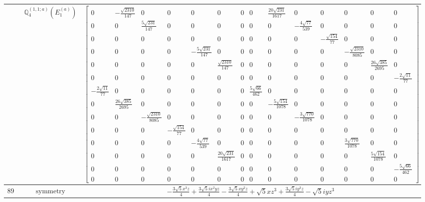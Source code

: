 \documentclass[fleqn,8pt,landscape]{jsarticle}
\begin{document}
\begin{longtable}{ccc}
$  $ & $ \mathbb{Q}_{4}^{(1,1;a)}(E_{1}^{(a)}) $ & $ \begin{bmatrix} 0 & - \frac{\sqrt{2310}}{147} & 0 & 0 & 0 & 0 & 0 & 0 & \frac{20 \sqrt{231}}{1617} & 0 & 0 & 0 & 0 & 0 \\ 0 & 0 & \frac{5 \sqrt{231}}{147} & 0 & 0 & 0 & 0 & 0 & 0 & - \frac{4 \sqrt{77}}{539} & 0 & 0 & 0 & 0 \\ 0 & 0 & 0 & 0 & 0 & 0 & 0 & 0 & 0 & 0 & - \frac{\sqrt{154}}{77} & 0 & 0 & 0 \\ 0 & 0 & 0 & 0 & - \frac{5 \sqrt{231}}{147} & 0 & 0 & 0 & 0 & 0 & 0 & - \frac{\sqrt{2310}}{8085} & 0 & 0 \\ 0 & 0 & 0 & 0 & 0 & \frac{\sqrt{2310}}{147} & 0 & 0 & 0 & 0 & 0 & 0 & \frac{26 \sqrt{385}}{2695} & 0 \\ 0 & 0 & 0 & 0 & 0 & 0 & 0 & 0 & 0 & 0 & 0 & 0 & 0 & - \frac{2 \sqrt{11}}{77} \\ - \frac{2 \sqrt{11}}{77} & 0 & 0 & 0 & 0 & 0 & 0 & \frac{5 \sqrt{66}}{462} & 0 & 0 & 0 & 0 & 0 & 0 \\ 0 & \frac{26 \sqrt{385}}{2695} & 0 & 0 & 0 & 0 & 0 & 0 & - \frac{5 \sqrt{154}}{1078} & 0 & 0 & 0 & 0 & 0 \\ 0 & 0 & - \frac{\sqrt{2310}}{8085} & 0 & 0 & 0 & 0 & 0 & 0 & - \frac{3 \sqrt{770}}{1078} & 0 & 0 & 0 & 0 \\ 0 & 0 & 0 & - \frac{\sqrt{154}}{77} & 0 & 0 & 0 & 0 & 0 & 0 & 0 & 0 & 0 & 0 \\ 0 & 0 & 0 & 0 & - \frac{4 \sqrt{77}}{539} & 0 & 0 & 0 & 0 & 0 & 0 & \frac{3 \sqrt{770}}{1078} & 0 & 0 \\ 0 & 0 & 0 & 0 & 0 & \frac{20 \sqrt{231}}{1617} & 0 & 0 & 0 & 0 & 0 & 0 & \frac{5 \sqrt{154}}{1078} & 0 \\ 0 & 0 & 0 & 0 & 0 & 0 & 0 & 0 & 0 & 0 & 0 & 0 & 0 & - \frac{5 \sqrt{66}}{462} \\ 0 & 0 & 0 & 0 & 0 & 0 & 0 & 0 & 0 & 0 & 0 & 0 & 0 & 0 \end{bmatrix} $ \\ \hline
$ 894 $ & $ \text{symmetry} $ & $ - \frac{3 \sqrt{5} x^{3} z}{4} + \frac{3 \sqrt{5} i x^{2} y z}{4} - \frac{3 \sqrt{5} x y^{2} z}{4} + \sqrt{5} x z^{3} + \frac{3 \sqrt{5} i y^{3} z}{4} - \sqrt{5} i y z^{3} $ \\

\end{longtable}
\end{document}
